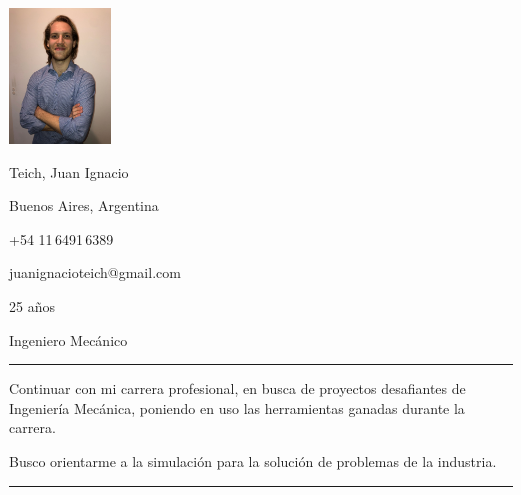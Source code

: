 \documentclass[a4paper,10pt]{article}
\newlength{\cvcolumngapwidth}
\newlength{\cvleftcolumnwidth}
\newlength{\cvrightcolumnwidth}
\newcommand{\cvnamestyle}[1]{{\Large\cvnamefont\textcolor{cvnamecolor}{#1}}}
\newcommand{\cvsectionstyle}[1]{{\normalsize\cvsectionfont\textcolor{cvsectioncolor}{#1}}}
\newcommand{\cvheadingstyle}[1]{{\normalsize\cvheadingfont\textcolor{cvheadingcolor}{#1}}}
\newlength{\cvafteritemskipamount}
\newlength{\cvaftersectionskipamount}
\newlength{\cvbetweensectionandheadingextraskipamount}
\newlength{\cvafternameskipamount}
\newlength{\cvafterpersonalinfolineskipamount}
\newlength{\cvparskip}
\newcommand{\cvpersonalinfo}[2]{
    \begin{minipage}[t]{\cvleftcolumnwidth}
        \vspace{0mm} %
        \raggedleft #1
    \end{minipage}%
    \hspace{\cvcolumngapwidth}%
    \begin{minipage}[t]{\cvrightcolumnwidth}
        \vspace{0mm} %
        #2
    \end{minipage}

    \vspace{\cvafteritemskipamount}
}
\newcommand{\cvname}[1]{
    \cvnamestyle{#1}

    \vspace{\cvafternameskipamount}
}
\newcommand{\cvpersonalinfolinewithicon}[3]{
    \raisebox{.5\fontcharht\font`E-.5\height}{\texttt{[image: \#2]}}
    #3

    \vspace{\cvafterpersonalinfolineskipamount}
}
\newcommand{\cvsection}[1]{
    \begin{minipage}[t]{\cvleftcolumnwidth}
        \raggedleft\cvsectionstyle{#1}
    \end{minipage}%
    \hspace{\cvcolumngapwidth}%
    \begin{minipage}[t]{\cvrightcolumnwidth}
        \textcolor{cvrulecolor}{\rule{\cvrightcolumnwidth}{0.3mm}}
    \end{minipage}

    \vspace{\cvaftersectionskipamount}
}
\newcommand{\cvitem}[2]{
    \begin{minipage}[t]{\cvleftcolumnwidth}
        \raggedleft #1
    \end{minipage}%
    \hspace{\cvcolumngapwidth}%
    \begin{minipage}[t]{\cvrightcolumnwidth}
        \setlength{\parskip}{\cvparskip} #2
    \end{minipage}

    \vspace{\cvafteritemskipamount}
}
\begin{document}

\cvpersonalinfo{
    \includegraphics[height=36mm]{../logos-photos/photo.jpg}
}{
    \cvname{Teich, Juan Ignacio}

    \cvpersonalinfolinewithicon{height=4mm}{../logos-photos/072-location.pdf}{
        Buenos Aires, Argentina
    }

    \cvpersonalinfolinewithicon{height=4mm}{../logos-photos/067-phone.pdf}{
        +54 11\,6491\,6389
    }

    \cvpersonalinfolinewithicon{height=4mm}{../logos-photos/070-envelop.pdf}{
        juanignacioteich@gmail.com
    }


        25 años
        \vspace{2mm}

        Ingeniero Mecánico
}


\cvsection{OBJETIVOS PROFESIONALES}

\vspace{\cvbetweensectionandheadingextraskipamount}
\cvitem{\cvheadingstyle{}}{
    Continuar con mi carrera profesional, en busca de proyectos desafiantes de Ingeniería Mecánica, poniendo en uso las herramientas ganadas durante la carrera.

    Busco orientarme a la simulación para la solución de problemas de la industria.
}


\cvsection{EXPERIENCIA LABORAL}
\end{document}
